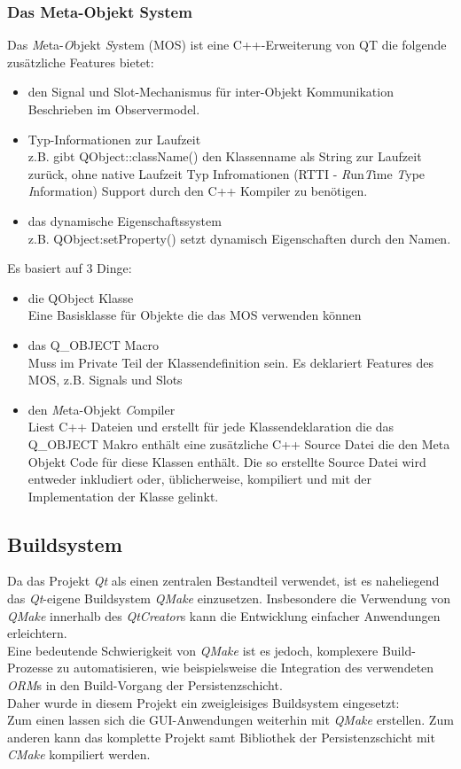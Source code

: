 \subsubsection{Das Meta-Objekt System}
Das \textit{M}eta-\textit{O}bjekt \textit{S}ystem (MOS) ist eine C++-Erweiterung von QT die folgende zusätzliche Features bietet:
\begin{itemize}
	\item den Signal und Slot-Mechanismus für inter-Objekt Kommunikation\\Beschrieben im Observermodel.
	\item Typ-Informationen zur Laufzeit\\z.B. gibt QObject::className() den Klassenname als String zur Laufzeit zurück, ohne native Laufzeit Typ Infromationen (RTTI - \textit{R}un\textit{T}ime \textit{T}ype \textit{I}nformation) Support durch den C++ Kompiler zu benötigen.
	\item das dynamische Eigenschaftssystem\\z.B. QObject:setProperty() setzt dynamisch Eigenschaften durch den Namen.
\end{itemize}
Es basiert auf 3 Dinge:
\begin{itemize}
	\item die QObject Klasse\\Eine Basisklasse für Objekte die das MOS verwenden können
	\item das Q\_OBJECT Macro\\Muss im Private Teil der Klassendefinition sein. Es deklariert Features des MOS, z.B. Signals und Slots
	\item den \textit{M}eta-{O}bjekt \textit{C}ompiler\\Liest C++ Dateien und erstellt für jede Klassendeklaration die das Q_OBJECT Makro enthält eine zusätzliche C++ Source Datei die den Meta Objekt Code für diese Klassen enthält. Die so erstellte Source Datei wird entweder inkludiert oder, üblicherweise, kompiliert und mit der Implementation der Klasse gelinkt.
\end{itemize}
\newpage
\subsection{Buildsystem}
Da das Projekt \textit{Qt} als einen zentralen Bestandteil verwendet, ist es naheliegend das \textit{Qt}-eigene Buildsystem \textit{QMake} einzusetzen. Insbesondere die Verwendung von \textit{QMake} innerhalb des \textit{QtCreator}s kann die Entwicklung einfacher Anwendungen erleichtern.\\
Eine bedeutende Schwierigkeit von \textit{QMake} ist es jedoch, komplexere Build-Prozesse zu automatisieren, wie beispielsweise die Integration des verwendeten \textit{ORM}s in den Build-Vorgang der Persistenzschicht.\\
Daher wurde in diesem Projekt ein zweigleisiges Buildsystem eingesetzt:\\
Zum einen lassen sich die GUI-Anwendungen weiterhin mit \textit{QMake} erstellen. Zum anderen kann das komplette Projekt samt Bibliothek der Persistenzschicht mit \textit{CMake} kompiliert werden.\\

